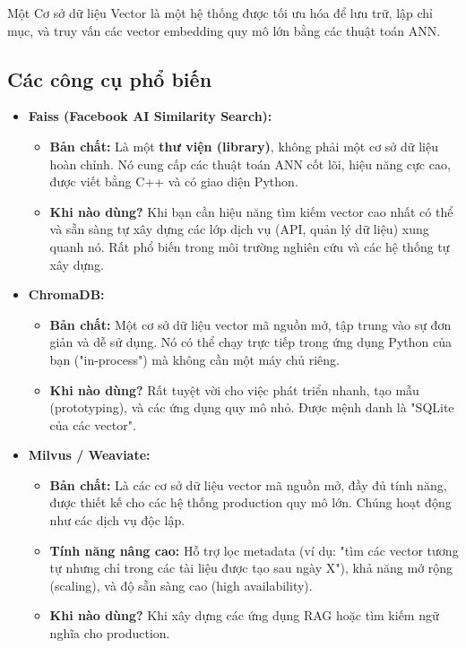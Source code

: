 Một Cơ sở dữ liệu Vector là một hệ thống được tối ưu hóa để lưu trữ, lập chỉ mục, và truy vấn các vector embedding quy mô lớn bằng các thuật toán ANN.

\subsection{Các công cụ phổ biến}
\label{ssec:vector_db_tools}
\begin{itemize}
    \item \textbf{Faiss (Facebook AI Similarity Search):}
        \begin{itemize}
            \item \textbf{Bản chất:} Là một \textbf{thư viện (library)}, không phải một cơ sở dữ liệu hoàn chỉnh. Nó cung cấp các thuật toán ANN cốt lõi, hiệu năng cực cao, được viết bằng C++ và có giao diện Python.
            \item \textbf{Khi nào dùng?} Khi bạn cần hiệu năng tìm kiếm vector cao nhất có thể và sẵn sàng tự xây dựng các lớp dịch vụ (API, quản lý dữ liệu) xung quanh nó. Rất phổ biến trong môi trường nghiên cứu và các hệ thống tự xây dựng.
        \end{itemize}
    \item \textbf{ChromaDB:}
        \begin{itemize}
            \item \textbf{Bản chất:} Một cơ sở dữ liệu vector mã nguồn mở, tập trung vào sự đơn giản và dễ sử dụng. Nó có thể chạy trực tiếp trong ứng dụng Python của bạn ("in-process") mà không cần một máy chủ riêng.
            \item \textbf{Khi nào dùng?} Rất tuyệt vời cho việc phát triển nhanh, tạo mẫu (prototyping), và các ứng dụng quy mô nhỏ. Được mệnh danh là "SQLite của các vector".
        \end{itemize}
    \item \textbf{Milvus / Weaviate:}
        \begin{itemize}
            \item \textbf{Bản chất:} Là các cơ sở dữ liệu vector mã nguồn mở, đầy đủ tính năng, được thiết kế cho các hệ thống production quy mô lớn. Chúng hoạt động như các dịch vụ độc lập.
            \item \textbf{Tính năng nâng cao:} Hỗ trợ lọc metadata (ví dụ: "tìm các vector tương tự nhưng chỉ trong các tài liệu được tạo sau ngày X"), khả năng mở rộng (scaling), và độ sẵn sàng cao (high availability).
            \item \textbf{Khi nào dùng?} Khi xây dựng các ứng dụng RAG hoặc tìm kiếm ngữ nghĩa cho production.

\end{itemize}
\end{itemize}
